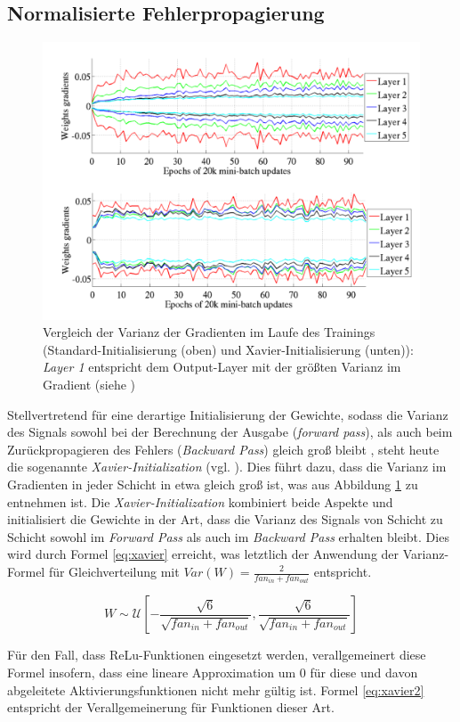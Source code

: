 \subsection{Normalisierte Fehlerpropagierung}
\begin{figure}
\centering
\includegraphics[width=0.7\linewidth]{images/4_xavier_init}
\caption[]{Vergleich der Varianz der Gradienten im Laufe des Trainings (Standard-Initialisierung (oben) und Xavier-Initialisierung (unten)): \textit{Layer 1} entspricht dem Output-Layer mit der größten Varianz im Gradient (siehe \cite{Glorot2010})}
\label{fig:4_xavier_init}
\end{figure}
Stellvertretend für eine derartige Initialisierung der Gewichte, sodass die Varianz des Signals sowohl bei der Berechnung der Ausgabe (\textit{forward pass}), als auch beim Zurückpropagieren des Fehlers (\textit{Backward Pass}) gleich groß bleibt  \cite[vgl. z.B.][S. 199 ff.]{Rojas1996}, steht heute die sogenannte \textit{Xavier-Initialization} (vgl. \cite{Glorot2010}). Dies führt dazu, dass die Varianz im Gradienten in jeder Schicht in etwa gleich groß ist, was aus Abbildung \ref{fig:4_xavier_init} zu entnehmen ist.
Die \textit{Xavier-Initialization} kombiniert beide Aspekte und initialisiert die Gewichte in der Art, dass die Varianz des Signals von Schicht zu Schicht sowohl im \textit{Forward Pass} als auch im \textit{Backward Pass} erhalten bleibt. Dies wird durch Formel \ref{eq:xavier} erreicht, was letztlich der Anwendung der Varianz-Formel für Gleichverteilung mit $Var(W) = \frac{2}{fan_{in}  + fan_{out}}$ entspricht.

\begin{equation}
\label{eq:xavier} 
W \sim \mathcal{U} [-\frac{\sqrt{6}}{\sqrt{fan_{in}  + fan_{out}}}, \frac{\sqrt{6}}{\sqrt{fan_{in}  + fan_{out}}}]
\end{equation}

Für den Fall, dass ReLu-Funktionen eingesetzt werden, verallgemeinert \cite{He2015} diese Formel insofern, dass eine lineare Approximation um $0$ für diese und davon abgeleitete Aktivierungsfunktionen nicht mehr gültig ist. Formel \ref{eq:xavier2} entspricht der Verallgemeinerung für Funktionen dieser Art. 


